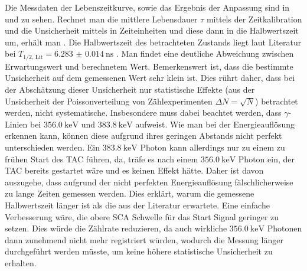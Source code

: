 Die Messdaten der Lebenszeitkurve, sowie das Ergebnis der Anpassung sind in  und  zu sehen. Rechnet man die mittlere Lebensdauer $\tau$ mittels der Zeitkalibration und die Unsicherheit mittels  in Zeiteinheiten und diese dann in die Halbwertszeit um, erhält man .
Die Halbwertszeit des betrachteten \caesium Zustands liegt laut Literatur bei $T_\text{1/2, Lit} = \SI{6.283(14)}{\nano\second}$ \cite[9]{525va}. Man findet eine deutliche Abweichung zwischen Erwartungswert und berechnetem Wert. Bemerkenswert ist, dass die bestimmte Unsicherheit auf dem gemessenen Wert sehr klein ist. Dies rührt daher, dass bei der Abschätzung dieser Unsicherheit nur statistische Effekte (aus der Unsicherheit der Poissonverteilung von Zählexperimenten $\Delta N = \sqrt{N}$) betrachtet werden, nicht systematische. Insbesondere muss dabei beachtet werden, dass \caesium $\gamma$-Linien bei $\SI{356.0}{\kilo\eV}$ und $\SI{383.8}{\kilo\eV}$ \cite[9]{525va} aufweist. Wie man bei der Energieauflösung erkennen kann, können diese aufgrund ihres geringen Abstands nicht perfekt unterschieden werden. Ein $\SI{383.8}{\kilo\eV}$ Photon kann allerdings nur zu einem zu frühen Start des TAC führen, da, träfe es nach einem $\SI{356.0}{\kilo\eV}$ Photon ein, der TAC bereits gestartet wäre und es keinen Effekt hätte. Daher ist davon auszugehe, dass aufgrund der nicht perfekten Energieauflösung fälschlicherweise zu lange Zeiten gemessen werden. Dies erklärt, warum die gemessene Halbwertszeit länger ist als die aus der Literatur erwartete. Eine einfache Verbesserung wäre, die obere SCA Schwelle für das Start Signal geringer zu setzen. Dies würde die Zählrate reduzieren, da auch wirkliche $\SI{356.0}{\kilo\eV}$ Photonen dann zunehmend nicht mehr registriert würden, wodurch die Messung länger durchgeführt werden müsste, um keine höhere statistische Unsicherheit zu erhalten.


